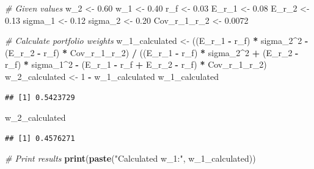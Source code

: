 \documentclass[
]{book}
\newenvironment{Shaded}{\begin{snugshade}}{\end{snugshade}}
\newcommand{\CommentTok}[1]{\textcolor[rgb]{0.56,0.35,0.01}{\textit{#1}}}
\newcommand{\DecValTok}[1]{\textcolor[rgb]{0.00,0.00,0.81}{#1}}
\newcommand{\FloatTok}[1]{\textcolor[rgb]{0.00,0.00,0.81}{#1}}
\newcommand{\FunctionTok}[1]{\textcolor[rgb]{0.13,0.29,0.53}{\textbf{#1}}}
\newcommand{\NormalTok}[1]{#1}
\newcommand{\OtherTok}[1]{\textcolor[rgb]{0.56,0.35,0.01}{#1}}
\newcommand{\SpecialCharTok}[1]{\textcolor[rgb]{0.81,0.36,0.00}{\textbf{#1}}}
\newcommand{\StringTok}[1]{\textcolor[rgb]{0.31,0.60,0.02}{#1}}
\begin{document}
\begin{Shaded}
\begin{Highlighting}[]
\CommentTok{\# Given values}
\NormalTok{w\_2 }\OtherTok{\textless{}{-}} \FloatTok{0.60}
\NormalTok{w\_1 }\OtherTok{\textless{}{-}} \FloatTok{0.40}
\NormalTok{r\_f }\OtherTok{\textless{}{-}} \FloatTok{0.03}
\NormalTok{E\_r\_1 }\OtherTok{\textless{}{-}} \FloatTok{0.08}
\NormalTok{E\_r\_2 }\OtherTok{\textless{}{-}} \FloatTok{0.13}
\NormalTok{sigma\_1 }\OtherTok{\textless{}{-}} \FloatTok{0.12}
\NormalTok{sigma\_2 }\OtherTok{\textless{}{-}} \FloatTok{0.20}
\NormalTok{Cov\_r\_1\_r\_2 }\OtherTok{\textless{}{-}} \FloatTok{0.0072}

\CommentTok{\# Calculate portfolio weights}
\NormalTok{w\_1\_calculated }\OtherTok{\textless{}{-}}\NormalTok{ ((E\_r\_1 }\SpecialCharTok{{-}}\NormalTok{ r\_f) }\SpecialCharTok{*}\NormalTok{ sigma\_2}\SpecialCharTok{\^{}}\DecValTok{2} \SpecialCharTok{{-}}\NormalTok{ (E\_r\_2 }\SpecialCharTok{{-}}\NormalTok{ r\_f) }\SpecialCharTok{*}\NormalTok{ Cov\_r\_1\_r\_2) }\SpecialCharTok{/}\NormalTok{ ((E\_r\_1 }\SpecialCharTok{{-}}\NormalTok{ r\_f) }\SpecialCharTok{*}\NormalTok{ sigma\_2}\SpecialCharTok{\^{}}\DecValTok{2} \SpecialCharTok{+}\NormalTok{ (E\_r\_2 }\SpecialCharTok{{-}}\NormalTok{ r\_f) }\SpecialCharTok{*}\NormalTok{ sigma\_1}\SpecialCharTok{\^{}}\DecValTok{2} \SpecialCharTok{{-}}\NormalTok{ (E\_r\_1 }\SpecialCharTok{{-}}\NormalTok{ r\_f }\SpecialCharTok{+}\NormalTok{ E\_r\_2 }\SpecialCharTok{{-}}\NormalTok{ r\_f) }\SpecialCharTok{*}\NormalTok{ Cov\_r\_1\_r\_2)}
\NormalTok{w\_2\_calculated }\OtherTok{\textless{}{-}} \DecValTok{1} \SpecialCharTok{{-}}\NormalTok{ w\_1\_calculated}
\NormalTok{w\_1\_calculated}
\end{Highlighting}
\end{Shaded}

\begin{verbatim}
## [1] 0.5423729
\end{verbatim}

\begin{Shaded}
\begin{Highlighting}[]
\NormalTok{w\_2\_calculated}
\end{Highlighting}
\end{Shaded}

\begin{verbatim}
## [1] 0.4576271
\end{verbatim}

\begin{Shaded}
\begin{Highlighting}[]
\CommentTok{\# Print results}
\FunctionTok{print}\NormalTok{(}\FunctionTok{paste}\NormalTok{(}\StringTok{"Calculated w\_1:"}\NormalTok{, w\_1\_calculated))}
\end{Highlighting}
\end{Shaded}
\end{document}
